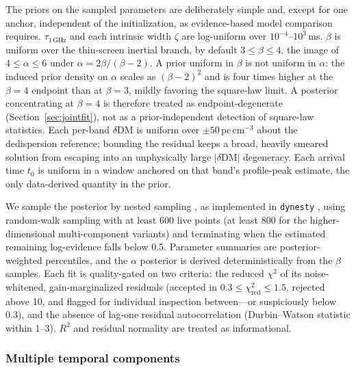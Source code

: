 The priors on the sampled parameters are deliberately simple and, except for
one anchor, independent of the initialization, as evidence-based model
comparison requires. $\tau_{1\,\mathrm{GHz}}$ and each intrinsic width
$\zeta$ are log-uniform over $10^{-4}$--$10^{3}$\,ms. $\beta$ is uniform over
the thin-screen inertial branch, by default $3\le\beta\le4$, the image of
$4\le\alpha\le6$ under $\alpha=2\beta/(\beta-2)$. A prior uniform in $\beta$
is not uniform in $\alpha$: the induced prior density on $\alpha$ scales as
$(\beta-2)^{2}$ and is four times higher at the $\beta=4$ endpoint than at
$\beta=3$, mildly favoring the square-law limit. A posterior concentrating at
$\beta=4$ is therefore treated as endpoint-degenerate
(Section~\ref{sec:jointfit}), not as a prior-independent detection of
square-law statistics. Each per-band
$\delta\mathrm{DM}$ is uniform over $\pm50\,\mathrm{pc\,cm^{-3}}$ about the
dedispersion reference; bounding the residual keeps a broad, heavily
smeared solution from escaping into an unphysically large
$|\delta\mathrm{DM}|$ degeneracy. Each arrival time $t_0$ is uniform in
a window anchored on that band's profile-peak estimate, the only
data-derived quantity in the prior.

We sample the posterior by nested
sampling \citep{Skilling2004}, as implemented in \texttt{dynesty}
\citep{Speagle2020}, using random-walk sampling with at least 600 live
points (at least 800 for the higher-dimensional multi-component variants)
and terminating when the estimated remaining log-evidence falls below 0.5.
Parameter summaries are posterior-weighted percentiles, and the $\alpha$
posterior is derived deterministically from the $\beta$ samples. Each fit is
quality-gated on two criteria: the reduced $\chi^2$ of its noise-whitened,
gain-marginalized residuals (accepted in $0.3\le\chi^2_\mathrm{red}\le1.5$,
rejected above 10, and flagged for individual inspection between---or
suspiciously below 0.3), and the absence of lag-one residual
autocorrelation (Durbin--Watson statistic within 1--3). $R^2$ and
residual normality are treated as informational.

\subsubsection{Multiple temporal components}
\label{sec:multicomp}
\label{sec:beta-multicomp}

